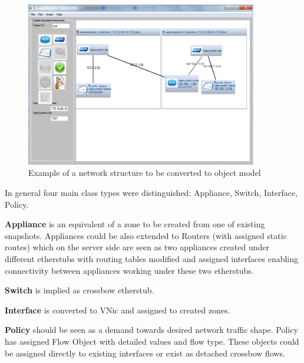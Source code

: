 \documentclass[11pt]{book}
\begin{document}
      \begin{figure}[H]
        \begin{center}
          \includegraphics[width=0.9\textwidth]{img/impl/network_structure_example.png}
        \end{center}
        \caption{Example of a network structure to be converted to object model}
      \end{figure} 

      In general four main class types were distinguished: Appliance, Switch, Interface, Policy.

		\medskip

      \textbf{Appliance} is an equivalent of a zone to be created from one of existing snapshots. Appliances could be
      also extended to Routers (with assigned static routes) which on the server side are seen as two appliances created
      under different etherstubs with routing tables modified and assigned interfaces enabling connectivity between
      appliances working under these two etherstubs.

      \textbf{Switch} is implied as crossbow etherstub.

      \textbf{Interface} is converted to VNic and assigned to created zones.

      \textbf{Policy} should be seen as a demand towards desired network traffic shape. Policy has assigned Flow Object
      with detailed values and flow type. These objects could be assigned directly to existing interfaces or exist as
      detached crossbow flows.
\end{document}
